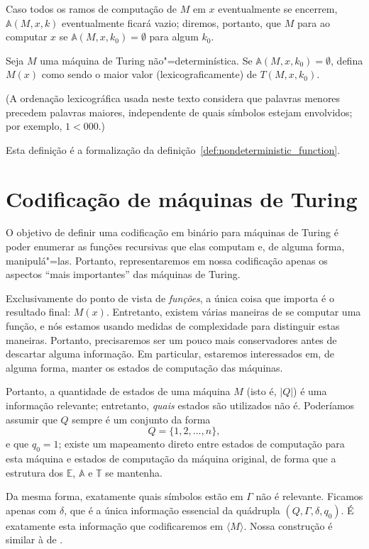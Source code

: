 Caso todos os ramos de computação de $M$ em $x$ eventualmente se encerrem,
$\mathbb A(M, x, k)$ eventualmente ficará vazio;
diremos,
portanto,
que $M$ para ao computar $x$ se $\mathbb A(M, x, k_0) = \emptyset$
para algum $k_0$.

\begin{definition}
    Seja $M$ uma máquina de Turing não"=determinística.
    Se $\mathbb A(M, x, k_0) = \emptyset$,
    defina $M(x)$ como sendo o maior valor
    (lexicograficamente)
    de $T(M, x, k_0)$.
\end{definition}
(A ordenação lexicográfica usada neste texto
considera que palavras menores precedem palavras maiores,
independente de quais símbolos estejam envolvidos;
por exemplo, $1 < 000$.)

Esta definição é a formalização da definição~\ref{def:nondeterministic_function}.

\section{Codificação de máquinas de Turing}

O objetivo de definir uma codificação em binário para máquinas de Turing
é poder enumerar as funções recursivas que elas computam
e, de alguma forma,
manipulá"=las.
Portanto,
representaremos em nossa codificação apenas os aspectos ``mais importantes''
das máquinas de Turing.

Exclusivamente do ponto de vista de \emph{funções},
a única coisa que importa é o resultado final: $M(x)$.
Entretanto,
existem várias maneiras de se computar uma função,
e nós estamos usando medidas de complexidade para distinguir estas maneiras.
Portanto,
precisaremos ser um pouco mais conservadores antes de descartar alguma informação.
Em particular,
estaremos interessados em,
de alguma forma,
manter os estados de computação das máquinas.

Portanto, a quantidade de estados de uma máquina $M$
(isto é, $|Q|$)
é uma informação relevante;
entretanto,
\emph{quais} estados são utilizados não é.
Poderíamos assumir que $Q$ sempre é um conjunto da forma
\begin{equation*}
    Q = \{1, 2, \dots, n\},
\end{equation*}
e que $q_0 = 1$;
existe um mapeamento direto entre estados de computação para esta máquina
e estados de computação da máquina original,
de forma que a estrutura dos $\mathbb E$, $\mathbb A$ e $\mathbb T$ se mantenha.

Da mesma forma,
exatamente quais símbolos estão em $\Gamma$
não é relevante.
Ficamos apenas com $\delta$,
que é a única informação essencial da quádrupla $(Q, \Gamma, \delta, q_0)$.
É exatamente esta informação que codificaremos em $\langle M \rangle$.
Nossa construção é similar à de .

